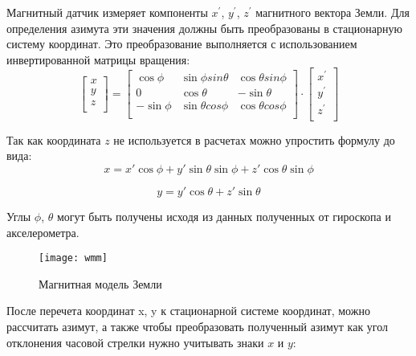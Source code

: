 Магнитный датчик измеряет компоненты $x^{'}$, $y^{'}$, $z^{'}$  магнитного вектора Земли. 
Для определения азимута эти значения должны быть преобразованы в стационарную систему координат.
Это преобразование выполняется с использованием инвертированной матрицы вращения:
\begin{equation}
    \label{eq:domain:invMagnetTilt}
    \begin{bmatrix} x \\ y \\ z \\ \end{bmatrix} = 
    \begin{bmatrix} \cos{\phi} & \sin{\phi}sin{\theta} & \cos{\theta}sin{\phi} \\ 
        0 & \cos{\theta} & -\sin{\theta} \\ 
        -\sin{\phi} & \sin{\theta}cos{\phi}& \cos{\theta}cos{\phi} \\ 
    \end{bmatrix}
    \cdot
    \begin{bmatrix} x^{'} \\ y^{'} \\ z^{'} \\ \end{bmatrix}
    \end{equation} 

Так как координата $z$ не используется в расчетах можно упростить формулу до вида:
\begin{equation}
    \label{eq:domain:xMagnetTilt}
    x = x'\cos{\phi}+y'\sin{\theta}\sin{\phi}+z'\cos{\theta}\sin{\phi}
    \end{equation} 

\begin{equation}
    \label{eq:domain:yMagnetTilt}
    y = y'\cos{\theta}+z'\sin{\theta}
    \end{equation} 

Углы $\phi$, $\theta$ могут быть получены исходя из данных полученных от гироскопа и акселерометра.

\begin{figure}[ht]
    \centering
    \texttt{[image: wmm]}
    \caption{Магнитная модель Земли}
    \label{pic:domain:wmm}
\end{figure}

После перечета координат x, y к стационарной системе координат, можно рассчитать азимут, 
а также чтобы преобразовать полученный азимут как угол отклонения часовой стрелки нужно 
учитывать знаки $x$ и $y$:

